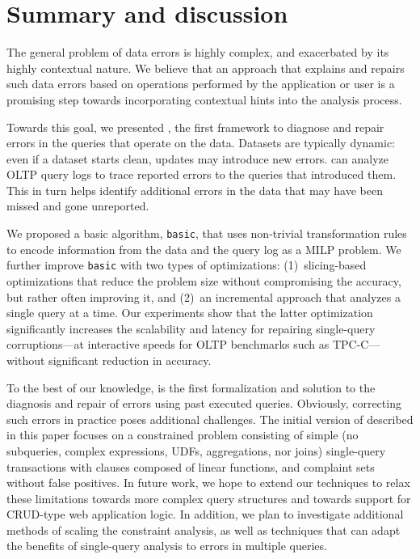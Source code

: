 

\section{Summary and discussion}

The general problem of data errors is highly complex, and exacerbated by its highly contextual nature.
We believe that an approach that explains and repairs such data errors based on operations performed by the application or user is a promising step towards incorporating contextual hints into the analysis process.

Towards this goal, we presented \sys, the first framework to diagnose and
repair errors in the queries that operate on the data.
Datasets are typically dynamic: even if a dataset starts clean,
updates may introduce new errors. \sys can
analyze OLTP query logs to trace reported errors to the queries that
introduced them. This in turn helps identify additional errors
in the data that may have been missed and gone unreported.

We proposed a basic algorithm, \texttt{basic}, that uses non-trivial transformation rules to
encode information from the data and the query log as a MILP problem. We further improve 
\texttt{basic} with two types of optimizations: 
(1)~slicing-based optimizations that reduce the problem
size without compromising the accuracy, but rather often improving it, and 
(2)~an incremental approach that analyzes a single query at a time. 
Our experiments show that the latter
optimization significantly increases the scalability and latency for repairing single-query corruptions---at interactive speeds for OLTP benchmarks such as TPC-C---without significant reduction in accuracy.

To the best of our knowledge, \sys is the first formalization and solution to the diagnosis
and repair of errors using past executed queries. 
Obviously, correcting such errors in practice poses additional challenges. 
The initial version of \sys described in this paper focuses on a constrained problem consisting of
simple (no subqueries, complex expressions, UDFs, aggregations, nor joins)
single-query transactions with clauses composed of linear functions, and
complaint sets without false positives.
In future work, we hope to extend our techniques to relax these limitations towards more complex query structures and towards support for CRUD-type web application logic.
In addition, we plan to investigate additional methods of scaling the constraint analysis, 
as well as techniques that can adapt the benefits of single-query analysis to errors in multiple queries.



